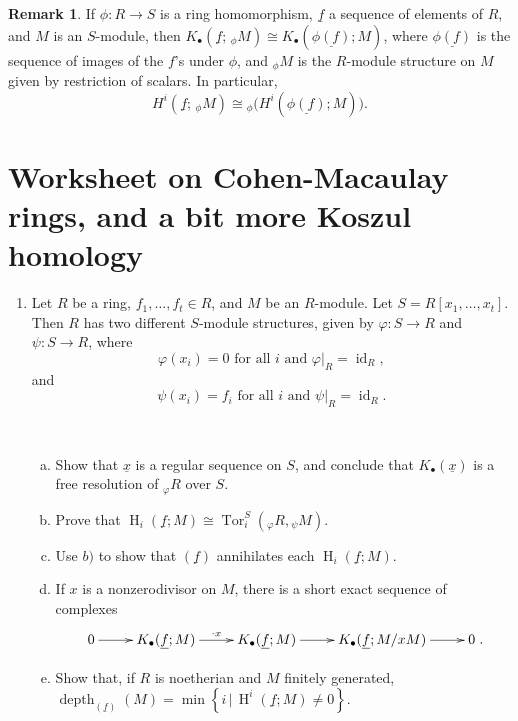\documentclass[11pt]{book}
\numberwithin{equation}{section}
\numberwithin{theorem}{chapter}
\theoremstyle{definition}
\newtheorem*{basic properties}{Basic Properties}
\newtheorem*{Important Remark}{Important Remark}
\newtheorem{remark}[theorem]{Remark}
\theoremstyle{remark}
\newcommand{\Tor}{\operatorname{Tor}}
\newcommand{\depth}{\operatorname{depth}}
\newcommand{\id}{\operatorname{id}}
\renewcommand{\H}{\operatorname{H}}
\begin{document}
\begin{remark}
	If $\phi:R\to S$ is a ring homomorphism, $\underline{f}$ a sequence of elements of $R$, and $M$ is an $S$-module, then $K_{\bullet}(\underline{f};\, _{\phi} \!M) \cong K_{\bullet}(\underline{\phi(f)}; M)$, where $\underline{\phi(f)}$ is the sequence of images of the $f$'s under $\phi$, and $_{\phi} \! M$ is the $R$-module structure on $M$ given by restriction of scalars. In particular, 
	\[ H^{i}(\underline{f};\, _{\phi} \!M) \cong  {}_\phi\big( H^{i}(\underline{\phi(f)}; M) \big). \] 
\end{remark}

\section{Worksheet on Cohen-Macaulay rings, and a bit more Koszul homology}

	\begin{enumerate}[1)]
	\item  Let $R$ be a ring, $f_1, \ldots, f_t \in R$, and $M$ be an $R$-module. Let $S = R[x_1, \ldots, x_t]$. Then $R$ has two different $S$-module structures, given by $\varphi\!: S \longrightarrow R$ and $\psi\!: S \longrightarrow R$, where
	$$\varphi(x_i) = 0 \textrm{ for all } i \textrm{ and } \varphi|_R = \id_R,$$
	and
	$$\psi(x_i) = f_i \textrm{ for all } i \textrm{ and } \psi|_R = \id_R.$$
	
	\
	
	\begin{enumerate}[a)]
		
		\item Show that $\underline{x}$ is a regular sequence on $S$, and conclude that $K_\bullet(\underline{x})$ is a free resolution of $_\varphi R$ over $S$.
		
		
		
		\item Prove that $\H_i(\underline{f};M) \cong \Tor_i^S({}_{\varphi}R,{}_{\psi} M).$
		
		
		
		\item Use $b)$ to show that $(\underline{f})$ annihilates each $\H_i(\underline{f};M)$.
		
		
		
		\item If $x$ is a nonzerodivisor on $M$, there is a short exact sequence of complexes 
		$$\xymatrix{0 \ar[r] & K_\bullet(\underline{f};M) \ar[r]^{\cdot x} & K_\bullet(\underline{f};M) \ar[r] & K_\bullet(\underline{f};M/xM) \ar[r] & 0}.$$
		
		
		
		
		\item Show that, if $R$ is noetherian and $M$ finitely generated, $\depth_{(\underline{f})} (M) = \min \left\lbrace i \, | \, \H^i(\underline{f};M) \neq 0 \right\rbrace$.
	\end{enumerate}
	
	
\end{enumerate}
\end{document}
